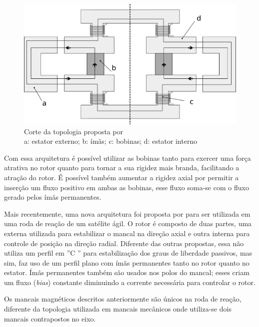 \begin{figure}[!ht]
	\centering
	\includegraphics[width=0.8\linewidth]{./Figs/mancais/alemao.pdf}
	\caption{Corte da topologia proposta por \cite{Scharfe2001} \\
	a: estator externo; b: ímãs; c: bobinas; d: estator interno}
	\label{Fig:modelo:alemao}
\end{figure} 

Com essa arquitetura é possível utilizar as bobinas tanto para exercer uma força atrativa no rotor quanto para tornar a sua rigidez mais branda, facilitando a atração do rotor. É possível também aumentar a rigidez axial por permitir a inserção um fluxo positivo em ambas as bobinas, esse fluxo soma-se com o fluxo gerado pelos ímãs permanentes.

Mais recentemente, uma nova arquitetura foi proposta por \citet{Bangcheng2012} para ser utilizada em uma roda de reação de um satélite ágil.  O rotor é composto de duas partes, uma externa utilizada para estabilizar o mancal na direção axial e outra interna para controle de posição na direção radial. Diferente das outras propostas, essa não utiliza um perfil em ''C ''  para estabilização dos graus de liberdade passivos, mas sim, faz uso de um perfil plano com ímãs permanentes tanto no rotor quanto no estator.  Ímãs permanentes também são usados nos polos do mancal; esses criam um fluxo (\textit{bias}) constante diminuindo a corrente necessária para controlar o rotor.
 
 
Os mancais magnéticos descritos anteriormente são únicos na roda de reação, diferente da topologia utilizada em mancais mecânicos onde utiliza-se dois mancais contrapostos no eixo.
 

